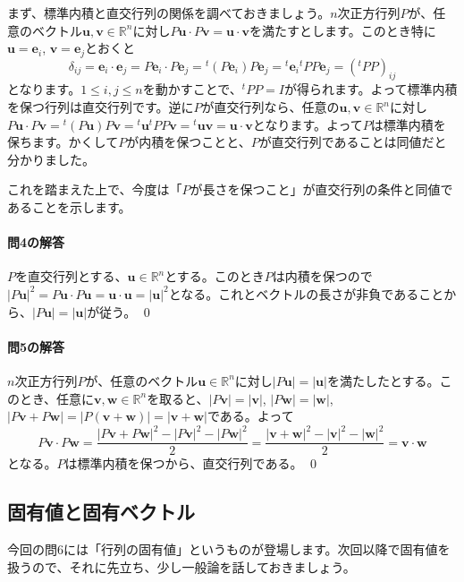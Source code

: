 まず、標準内積と直交行列の関係を調べておきましょう。$n$次正方行列$P$が、任意のベクトル$\bm{u}, \bm{v} \in \mathbb{R}^n$に対し$P\bm{u} \cdot P\bm{v} = \bm{u} \cdot \bm{v}$を満たすとします。このとき特に$\bm{u} = \bm{e}_i$, $\bm{v} = \bm{e}_j$とおくと
\[
\delta_{ij} = \bm{e}_i \cdot \bm{e}_j = P\bm{e}_i \cdot P\bm{e}_j = {}^t(P\bm{e}_i) P\bm{e}_j = {}^t\bm{e}_i {}^tP P \bm{e}_j = ({}^tP P)_{ij}
\]
となります。$1 \leq i, j\leq n$を動かすことで、${}^tPP = I$が得られます。よって標準内積を保つ行列は直交行列です。逆に$P$が直交行列なら、任意の$\bm{u}, \bm{v} \in \mathbb{R}^n$に対し$P\bm{u} \cdot P\bm{v} = {}^t(P\bm{u}) P\bm{v} = {}^t\bm{u} {}^tP P\bm{v} = {}^t\bm{u} \bm{v} = \bm{u} \cdot \bm{v}$となります。よって$P$は標準内積を保ちます。かくして$P$が内積を保つことと、$P$が直交行列であることは同値だと分かりました。

これを踏まえた上で、今度は「$P$が長さを保つこと」が直交行列の条件と同値であることを示します。

\paragraph{問4の解答} $P$を直交行列とする、$\bm{u} \in \mathbb{R}^n$とする。このとき$P$は内積を保つので$|P\bm{u}|^2 = P\bm{u} \cdot P\bm{u} = \bm{u} \cdot \bm{u} = |\bm{u}|^2$となる。これとベクトルの長さが非負であることから、$|P\bm{u}| = |\bm{u}|$が従う。 \qed

\paragraph{問5の解答}

$n$次正方行列$P$が、任意のベクトル$\bm{u} \in \mathbb{R}^n$に対し$|P\bm{u}| = |\bm{u}|$を満たしたとする。このとき、任意に$\bm{v}, \bm{w} \in \mathbb{R}^n$を取ると、$|P \bm{v}| = |\bm{v}|$, $|P \bm{w}| = |\bm{w}|$, $|P\bm{v} + P\bm{w}| = |P (\bm{v} + \bm{w})| = |\bm{v} + \bm{w}|$である。よって
\[
P\bm{v} \cdot P \bm{w}
= \frac{|P\bm{v} + P\bm{w}|^2 - |P\bm{v}|^2 - |P\bm{w}|^2}{2}
= \frac{|\bm{v} + \bm{w}|^2 - |\bm{v}|^2 - |\bm{w}|^2}{2}
= \bm{v} \cdot \bm{w}
\]
となる。$P$は標準内積を保つから、直交行列である。 \qed 

\subsection{固有値と固有ベクトル}

今回の問6には「行列の固有値」というものが登場します。次回以降で固有値を扱うので、それに先立ち、少し一般論を話しておきましょう。

